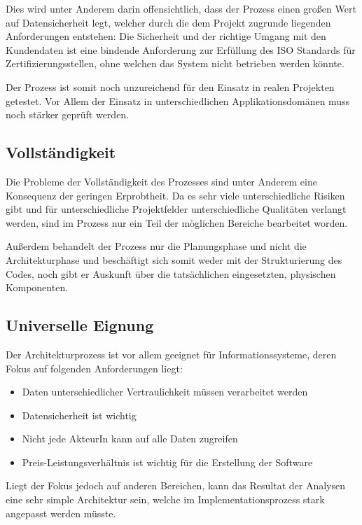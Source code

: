 Dies wird unter Anderem darin offensichtlich, dass der Prozess einen großen Wert auf Datensicherheit legt, welcher durch die dem Projekt zugrunde liegenden Anforderungen entstehen: Die Sicherheit und der richtige Umgang mit den Kundendaten ist eine bindende Anforderung zur Erfüllung des ISO Standards für Zertifizierungsstellen, ohne welchen das System nicht betrieben werden könnte. \cite{ISO_CERT}

Der Prozess ist somit noch unzureichend für den Einsatz in realen Projekten getestet. Vor Allem der Einsatz in unterschiedlichen Applikationsdomänen muss noch stärker geprüft werden.

\subsection{Vollständigkeit}
Die Probleme der Vollständigkeit des Prozesses sind unter Anderem eine Konsequenz der geringen Erprobtheit. Da es sehr viele unterschiedliche Risiken gibt und für unterschiedliche Projektfelder unterschiedliche Qualitäten verlangt werden, sind im Prozess nur ein Teil der möglichen Bereiche bearbeitet worden.

Außerdem behandelt der Prozess nur die Planungsphase und nicht die Architekturphase und beschäftigt sich somit weder mit der Strukturierung des Codes, noch gibt er Auskunft über die tatsächlichen eingesetzten, physischen Komponenten.


\subsection{Universelle Eignung}
Der Architekturprozess ist vor allem geeignet für Informationssysteme, deren Fokus auf folgenden Anforderungen liegt:

\begin{itemize}
  \item Daten unterschiedlicher Vertraulichkeit müssen verarbeitet werden
  \item Datensicherheit ist wichtig
  \item Nicht jede AkteurIn kann auf alle Daten zugreifen
  \item Preis-Leistungsverhältnis ist wichtig für die Erstellung der Software
\end{itemize}

Liegt der Fokus jedoch auf anderen Bereichen, kann das Resultat der Analysen eine sehr simple Architektur sein, welche im Implementationsprozess stark angepasst werden müsste.

